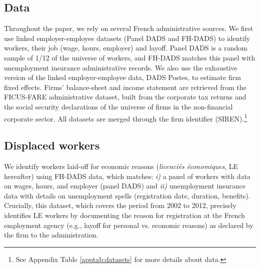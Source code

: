 

\subsection{Data}
Throughout the paper, we rely on several French administrative sources. We first use linked employer-employee datasets (Panel DADS and FH-DADS) to identify workers, their job (wage, hours, employer) and layoff. Panel DADS is a random sample of 1/12 of the universe of workers, and FH-DADS matches this panel with unemployment insurance administrative records. 
We also use the exhaustive version of the linked employer-employee data, DADS Postes, to estimate firm fixed effects. %
Firms' balance-sheet and income statement are retrieved from the FICUS-FARE administrative dataset, built from the corporate tax returns and the social security declarations of the universe of firms in the non-financial corporate sector. All datasets are merged through the firm identifier (SIREN).\footnote{See Appendix Table \ref{apptab:datasets} for more details about data.}


\subsection{Displaced workers}  
\label{sec:data:displaced}


We identify workers laid-off for economic reasons (\textit{licenciés économiques}, LE hereafter) using FH-DADS data, which matches: \textit{i)} a panel of workers with data on wages, hours, and employer (panel DADS) and \textit{ii)} unemployment insurance data with details on unemployment spells (registration date, duration, benefits). Crucially, this dataset, which covers the period from 2002 to 2012, precisely identifies LE workers by documenting the reason for registration at the French employment agency (e.g., layoff for personal vs. economic reasons) as declared by the firm to the administration.

